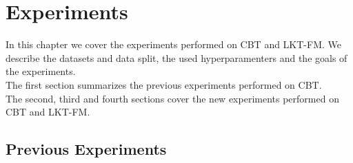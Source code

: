 \chapter{Experiments}
\label{ch:experiments}

In this chapter we cover the experiments performed on CBT and LKT-FM. We describe the datasets and data split, the used hyperparamenters and the goals of the experiments.\\
The first section summarizes the previous experiments performed on CBT.\\
The second, third and fourth sections cover the new experiments performed on CBT and LKT-FM.



\section{Previous Experiments}

